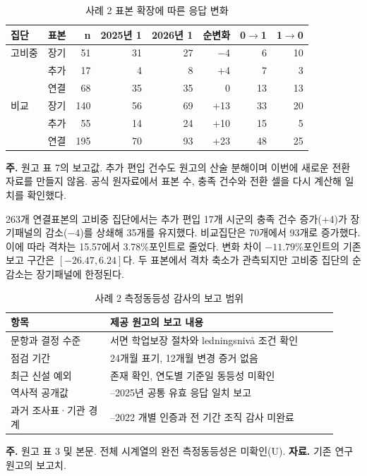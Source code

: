 \documentclass[11pt,a4paper]{article}
\begin{document}
\begin{table}[htbp]\centering\small
\caption{사례 2 표본 확장에 따른 응답 변화}\label{tab:c2expand}
\begin{tabular}{lrrrrrrr}
\toprule
집단 & 표본 & n & 2025년 1 & 2026년 1 & 순변화 & 0$\to$1 & 1$\to$0 \\
\midrule
고비중 & 장기 & 51 & 31 & 27 & $-$4 & 6 & 10 \\
 & 추가 & 17 & 4 & 8 & +4 & 7 & 3 \\
 & 연결 & 68 & 35 & 35 & 0 & 13 & 13 \\
비교 & 장기 & 140 & 56 & 69 & +13 & 33 & 20 \\
 & 추가 & 55 & 14 & 24 & +10 & 15 & 5 \\
 & 연결 & 195 & 70 & 93 & +23 & 48 & 25 \\
\bottomrule\end{tabular}
\par\vspace{3pt}\begin{minipage}{.98\linewidth}\footnotesize \raggedright\textbf{주.} 원고 표 7의 보고값. 추가 편입 건수도 원고의 산술 분해이며 이번에 새로운 전환 자료를 만들지 않음. 공식 원자료에서 표본 수, 충족 건수와 전환 셀을 다시 계산해 일치를 확인했다.\end{minipage}
\end{table}
263개 연결표본의 고비중 집단에서는 추가 편입 17개 시군의 충족 건수 증가(+4)가 장기패널의 감소($-4$)를 상쇄해 35개를 유지했다. 비교집단은 70개에서 93개로 증가했다. 이에 따라 격차는 15.57에서 3.78\%포인트로 줄었다. 변화 차이 $-11.79$\%포인트의 기존 보고 구간은 $[-26.47,6.24]$다. 두 표본에서 격차 축소가 관측되지만 고비중 집단의 순감소는 장기패널에 한정된다.
\begin{table}[htbp]\centering\small
\caption{사례 2 측정동등성 감사의 보고 범위}\label{tab:c2audit}
\begin{tabular}{>{\raggedright\arraybackslash}p{0.28\linewidth} >{\raggedright\arraybackslash}p{0.64\linewidth}}
\toprule
항목 & 제공 원고의 보고 내용 \\
\midrule
문항과 결정 수준 & 서면 학업보장 절차와 ledningsnivå 조건 확인 \\
점검 기간 & 24개월 표기, 12개월 변경 증거 없음 \\
최근 신설 예외 & 존재 확인, 연도별 기준일 동등성 미확인 \\
역사적 공개값 & 2023–2025년 공통 유효 응답 일치 보고 \\
과거 조사표·기관 경계 & 2018–2022 개별 인증과 전 기간 조직 감사 미완료 \\
\bottomrule\end{tabular}
\par\vspace{3pt}\begin{minipage}{.98\linewidth}\footnotesize \raggedright\textbf{주.} 원고 표 3 및 본문. 전체 시계열의 완전 측정동등성은 미확인(U). \textbf{자료.} 기존 연구원고의 보고치.\end{minipage}
\end{table}
\end{document}
